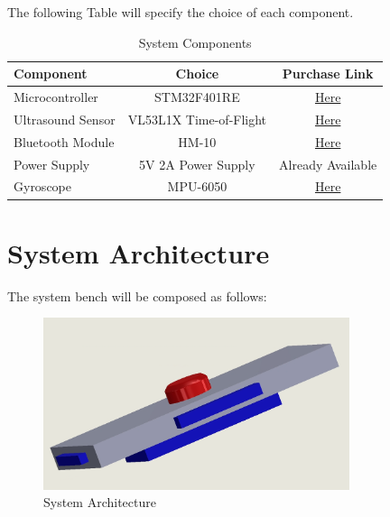 \documentclass[12pt]{article}
\numberwithin{equation}{section}
\begin{document}
The following Table will specify the choice of each component.
\begin{table}
  \centering
  \caption{System Components}
  \label{tab:system_components}
  \begin{tabular}{lcc}
    \toprule
    \textbf{Component} & \textbf{Choice} & \textbf{Purchase Link} \\
    \midrule
    Microcontroller & STM32F401RE & \href{https://www.amazon.com/gp/product/B06WGZB2N4/ref=ox_sc_act_title_1?smid=AFLYC5O31PGVX&psc=1}{Here}  \\
    Ultrasound Sensor & VL53L1X Time-of-Flight & \href{https://www.amazon.com/gp/product/B01EV70C78/ref=ox_sc_act_title_3?smid=A2WWHQ25ENKVJ1&psc=1}{Here}  \\
    Bluetooth Module & HM-10 & \href{https://www.amazon.com/gp/product/B06WGZB2N4/ref=ox_sc_act_title_1?smid=AFLYC5O31PGVX&psc=1}{Here}  \\
    Power Supply & 5V 2A Power Supply & Already Available \\
    Gyroscope & MPU-6050 & \href{https://www.amazon.com/gp/product/B0B793846N/ref=ox_sc_act_title_2?smid=A1YZW40LYQY3L1&psc=1}{Here} \\
    \bottomrule
  \end{tabular}
\end{table}


\section{System Architecture}
The system bench will be composed as follows:
\begin{figure}[H]
  \centering
  \includegraphics[width=0.8\textwidth]{Figures/Final.png}
  \caption{System Architecture}
  \label{fig:system_architecture}
\end{figure}
\end{document}
